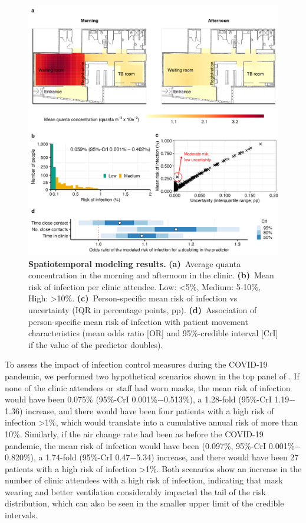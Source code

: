 \documentclass[fleqn,11pt]{wlscirep}
\begin{document}
\begin{figure}
    \centering
    \includegraphics{results/modeling/main-figure.png}
    \caption{\textbf{Spatiotemporal modeling results.} \textbf{(a)}~Average quanta concentration in the morning and afternoon in the clinic. \textbf{(b)}~Mean risk of infection per clinic attendee. Low: <5\%, Medium: 5-10\%, High: >10\%. \textbf{(c)}~Person-specific mean risk of infection vs uncertainty (IQR in percentage points, pp). \textbf{(d)}~Association of person-specific mean risk of infection with patient movement characteristics (mean odds ratio [OR] and 95\%-credible interval [CrI] if the value of the predictor doubles).}
    \label{fig:main-modeling-results}
\end{figure}

To assess the impact of infection control measures during the COVID-19 pandemic, we performed two hypothetical scenarios shown in the top panel of . If none of the clinic attendees or staff had worn masks, the mean risk of infection would have been 0.075\% (95\%-CrI 0.001\%$-$0.513\%), a 1.28-fold (95\%-CrI 1.19$-$1.36) increase, and there would have been four patients with a high risk of infection >1\%, which would translate into a cumulative annual risk of more than 10\%. Similarly, if the air change rate had been as before the COVID-19 pandemic, the mean risk of infection would have been (0.097\%, 95\%-CrI 0.001\%$-$0.820\%), a 1.74-fold (95\%-CrI 0.47$-$5.34) increase, and there would have been 27 patients with a high risk of infection >1\%. Both scenarios show an increase in the number of clinic attendees with a high risk of infection, indicating that mask wearing and better ventilation considerably impacted the tail of the risk distribution, which can also be seen in the smaller upper limit of the credible intervals. 
\end{document}
